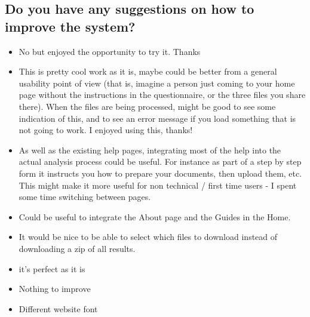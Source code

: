 \documentclass{l4proj}
\begin{document}
\begin{appendices}
\begin{itemize}
\end{itemize}

\newpage
\subsection{Do you have any suggestions on how to improve the system?}

\begin{itemize}
    \item No but enjoyed the opportunity to try it. Thanks
    \item This is pretty cool work as it is, maybe could be better from a general usability point of view (that is, imagine a person just coming to your home page without the instructions in the questionnaire, or the three files you share there). When the files are being processed, might be good to see some indication of this, and to see an error message if you load something that is not going to work. I enjoyed using this, thanks!
    \item As well as the existing help pages, integrating most of the help into the actual analysis process could be useful. For instance as part of a step by step form it instructs you how to prepare your documents, then upload them, etc. This might make it more useful for non technical / first time users - I spent some time switching between pages.
    \item Could be useful to integrate the About page and the Guides in the Home.
    \item It would be nice to be able to select which files to download instead of downloading a zip of all results.
    \item it's perfect as it is
    \item Nothing to improve
    \item Different website font

\end{itemize}







\end{appendices}






\end{document}

